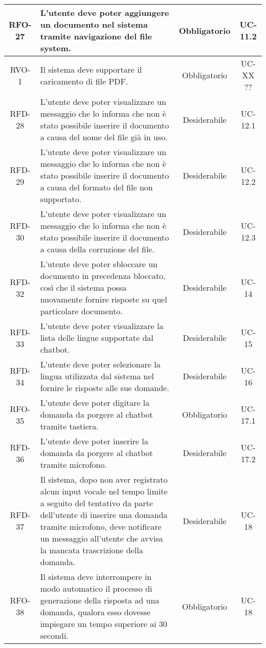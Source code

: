 \begin{xltabular}{\textwidth}{| c | X | c | c |}
    \hline
    RFO-27 & L’utente deve poter aggiungere un documento nel sistema tramite navigazione del file system. & Obbligatorio & UC-11.2 \\
    \hline
    RVO-1 & Il sistema deve supportare il caricamento di file PDF. & Obbligatorio & UC-XX ?? \\ %
    \hline
    RFD-28 & L'utente deve poter visualizzare un messaggio che lo informa che non è stato possibile inserire il documento a causa del nome del file già in uso. & Desiderabile & UC-12.1 \\
    \hline
    RFD-29 & L'utente deve poter visualizzare un messaggio che lo informa che non è stato possibile inserire il documento a causa del formato del file non supportato. & Desiderabile & UC-12.2 \\
    \hline
    RFD-30 & L'utente deve poter visualizzare un messaggio che lo informa che non è stato possibile inserire il documento a causa della corruzione del file. & Desiderabile & UC-12.3 \\
    \hline
    \hline
    RFD-32 & L’utente deve poter sbloccare un documento in precedenza bloccato, così che il sistema possa nuovamente fornire risposte su quel particolare documento. & Desiderabile & UC-14 \\
    \hline
    RFD-33 & L’utente deve poter visualizzare la lista delle lingue supportate dal chatbot. & Desiderabile & UC-15 \\
    \hline
    RFD-34 & L’utente deve poter selezionare la lingua utilizzata dal sistema nel fornire le risposte alle sue domande. & Desiderabile & UC-16 \\
    \hline
    RFO-35 & L’utente deve poter digitare la domanda da porgere al chatbot tramite tastiera. & Obbligatorio & UC-17.1 \\
    \hline
    RFD-36 & L’utente deve poter inserire la domanda da porgere al chatbot tramite microfono. & Desiderabile & UC-17.2 \\
    \hline
    RFD-37 & Il sistema, dopo non aver registrato alcun input vocale nel tempo limite a seguito del tentativo da parte dell'utente di inserire una domanda tramite microfono, deve notificare un messaggio all'utente che avvisa la mancata trascrizione della domanda. & Desiderabile & UC-18 \\
    \hline
    RFO-38 & Il sistema deve interrompere in modo automatico il processo di generazione della risposta ad una domanda, qualora esso dovesse impiegare un tempo superiore ai 30 secondi. & Obbligatorio & UC-18\\

\end{xltabular}
